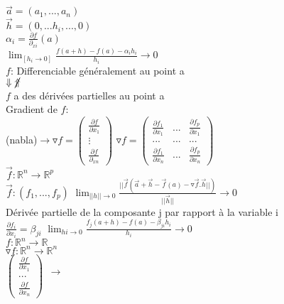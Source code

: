 \documentclass{article}
\begin{document}
    $\vec{a}=(a_1,...,a_n)$\\
    $\vec{h}=(0,...h_i,...,0)$\\
    $\alpha_i =\frac{\partial f}{\partial_{xi}}(a)$\\
    $\lim_[h_i\to 0]\frac{f(a+h)-f(a)-\alpha_i h_i}{h_i}\to 0$\\
    $f$: Differenciable généralement au point a\\
    $\Downarrow \cancel{\Uparrow}$\\
    $f$ a des dérivées partielles au point a\\
    Gradient de $f$:\\
    (nabla)$\to\triangledown f =
    \begin{pmatrix}
        \frac{\partial f}{\partial x_1}\\
        \vdots\\
        \frac{\partial f}{\partial_{xn}}
    \end{pmatrix}$
    $\triangledown f=
    \begin{pmatrix}
        \frac{\partial f_1}{\partial x_1} &...& \frac{\partial f_p}{\partial x_1}\\
        ...&...&...\\
        \frac{\partial f_1}{\partial x_n} &...& \frac{\partial f_p}{\partial x_n}
    \end{pmatrix}$\\
    $\vec{f}: \mathbb{R}^n\to \mathbb{R}^p$\\
    $\vec{f}:(f_1,...,f_p)$
    $\lim_{||h||\to 0}\frac{||\vec{f}(\vec{a}+\vec{h}-\vec{f}(a)-\triangledown\vec{f}.\vec{h}||)}{||\vec{h}||}\to 0$\\
    Dérivée partielle de la composante j par rapport à la variable i\\
    $\frac{\partial f_i}{\partial x_i} = \beta_{ji}$
    $\lim_{hi\to 0}\frac{f_j(a+h)-f(a)-\beta_{ji}h_i}{h_i}\to 0$\\
    $f:\mathbb{R}^n\to \mathbb{R}$\\
    $\triangledown f: \mathbb{R}^n\to \mathbb{R}^n$\\
    $\begin{pmatrix}
        \frac{\partial f}{\partial x_1}\\
        ...\\
        \frac{\partial f}{\partial x_n}
    \end{pmatrix}$
    $\begin{matrix}
        \to\\
        \\
    \end{matrix}$
\end{document}
